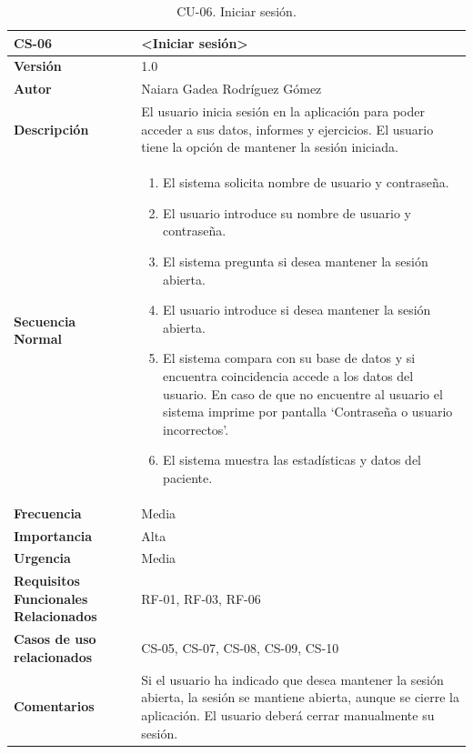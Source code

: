 \begin{table}[h!]
\centering
\begin{tabular}{ |m{3cm}|m{11cm}|  } 
\hline
\cellcolor[HTML]{B9E3F0}\textbf{CS-06} & \cellcolor[HTML]{B9E3F0}\textbf{<Iniciar sesión>}\\

\hline
\cellcolor[HTML]{EFEFEF}\textbf{Versión}             & 1.0  \\
\hline
\cellcolor[HTML]{EFEFEF}\textbf{Autor}                & Naiara Gadea Rodríguez Gómez\\
\hline
\cellcolor[HTML]{EFEFEF}\textbf{Descripción}                & {El usuario inicia sesión en la aplicación para poder acceder a sus datos, informes y ejercicios. El usuario tiene la opción de mantener la sesión iniciada. }\\
\hline
\cellcolor[HTML]{EFEFEF}\textbf{Secuencia \newline Normal}                &                 
        \begin{enumerate}
			\def\labelenumi{\arabic{enumi}.}
			\tightlist
			\item El sistema solicita nombre de usuario y contraseña.
			\item El usuario introduce su nombre de usuario y contraseña. 
                \item El sistema pregunta si desea mantener la sesión abierta.
                \item El usuario introduce si desea mantener la sesión abierta. 
                \item El sistema compara con su base de datos y si encuentra coincidencia accede a los datos del usuario. En caso de que no encuentre al usuario el sistema imprime por pantalla ‘Contraseña o usuario incorrectos’.
                \item El sistema muestra las estadísticas y datos del paciente.
		\end{enumerate}\\
\hline
\cellcolor[HTML]{EFEFEF}\textbf{Frecuencia}                & Media\\
\hline
\cellcolor[HTML]{EFEFEF}\textbf{Importancia}                & Alta\\
\hline
\cellcolor[HTML]{EFEFEF}\textbf{Urgencia}                & Media\\
\hline
\cellcolor[HTML]{EFEFEF}\textbf{Requisitos Funcionales Relacionados}                & {RF-01, RF-03, RF-06 }\\
\hline
\cellcolor[HTML]{EFEFEF}\textbf{Casos de uso relacionados}                & {CS-05, CS-07, CS-08, CS-09, CS-10}\\
\hline
\cellcolor[HTML]{EFEFEF}\textbf{Comentarios}                & {Si el usuario ha indicado que desea mantener la sesión abierta, la sesión se mantiene abierta, aunque se cierre la aplicación. El usuario deberá cerrar manualmente su sesión. }\\
\hline
\end{tabular}
\caption{CU-06. Iniciar sesión.}
\end{table}

